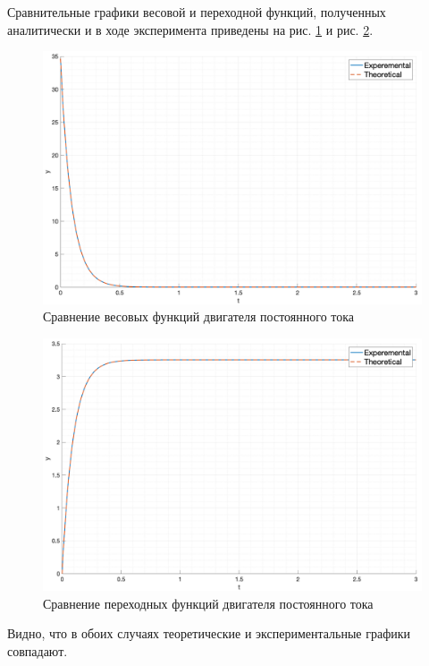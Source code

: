 Сравнительные графики весовой и переходной функций, полученных аналитически и в ходе эксперимента приведены на рис. \ref{fig:task1_impulse_response_cmp} и рис. \ref{fig:task1_step_response_cmp}.
\begin{figure}[ht!]
    \centering
    \includegraphics[width=\textwidth]{media/plots/task1_impulse_response_cmp.png}
    \caption{Сравнение весовых функций двигателя постоянного тока}
    \label{fig:task1_impulse_response_cmp}
\end{figure}
\begin{figure}[ht!]
    \centering
    \includegraphics[width=\textwidth]{media/plots/task1_step_response_cmp.png}
    \caption{Сравнение переходных функций двигателя постоянного тока}
    \label{fig:task1_step_response_cmp}
\end{figure}

Видно, что в обоих случаях теоретические и экспериментальные графики совпадают.


